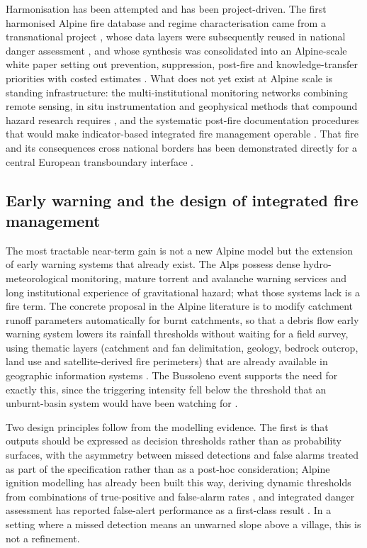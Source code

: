 \documentclass[11pt,a4paper]{article}
\begin{document}
Harmonisation has been attempted and has been project-driven. The first harmonised Alpine fire database and regime characterisation came from a transnational project \citep{valese_wildfires_2011}, whose data layers were subsequently reused in national danger assessment \citep{muller_towards_2020}, and whose synthesis was consolidated into an Alpine-scale white paper setting out prevention, suppression, post-fire and knowledge-transfer priorities with costed estimates \citep{muller_forest_2020}. What does not yet exist at Alpine scale is standing infrastructure: the multi-institutional monitoring networks combining remote sensing, in situ instrumentation and geophysical methods that compound hazard research requires \citep{baselt_compound_2026}, and the systematic post-fire documentation procedures that would make indicator-based integrated fire management operable \citep{melzner_wildfire-induced_2025}. That fire and its consequences cross national borders has been demonstrated directly for a central European transboundary interface \citep{avouris_exposure_2025}.

\subsection{Early warning and the design of integrated fire management}

The most tractable near-term gain is not a new Alpine model but the extension of early warning systems that already exist. The Alps possess dense hydro-meteorological monitoring, mature torrent and avalanche warning services and long institutional experience of gravitational hazard; what those systems lack is a fire term. The concrete proposal in the Alpine literature is to modify catchment runoff parameters automatically for burnt catchments, so that a debris flow early warning system lowers its rainfall thresholds without waiting for a field survey, using thematic layers (catchment and fan delimitation, geology, bedrock outcrop, land use and satellite-derived fire perimeters) that are already available in geographic information systems \citep{tiranti_wildfires_2021}. The Bussoleno event supports the need for exactly this, since the triggering intensity fell below the threshold that an unburnt-basin system would have been watching for \citep{laporta_postwildfire_2025}.

Two design principles follow from the modelling evidence. The first is that outputs should be expressed as decision thresholds rather than as probability surfaces, with the asymmetry between missed detections and false alarms treated as part of the specification rather than as a post-hoc consideration; Alpine ignition modelling has already been built this way, deriving dynamic thresholds from combinations of true-positive and false-alarm rates \citep{moreno_1_nodate}, and integrated danger assessment has reported false-alert performance as a first-class result \citep{muller_towards_2020}. In a setting where a missed detection means an unwarned slope above a village, this is not a refinement.
\end{document}
